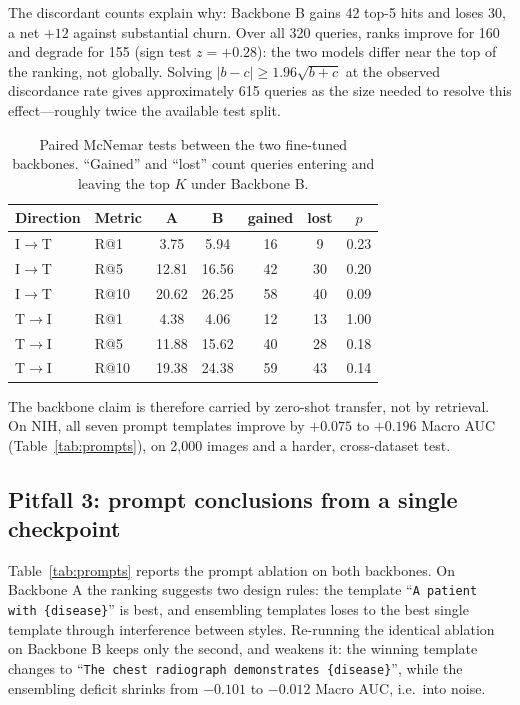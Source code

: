 \documentclass[runningheads]{llncs}
\begin{document}
The discordant counts explain why: Backbone B gains 42 top-5 hits and loses 30,
a net $+12$ against substantial churn. Over all 320 queries, ranks improve for
160 and degrade for 155 (sign test $z=+0.28$): the two models differ near the top
of the ranking, not globally. Solving
$|b-c| \geq 1.96\sqrt{b+c}$ at the observed discordance rate gives approximately
615 queries as the size needed to resolve this effect---roughly twice the
available test split.

\begin{table}[t]
\centering
\caption{Paired McNemar tests between the two fine-tuned backbones. ``Gained''
and ``lost'' count queries entering and leaving the top $K$ under Backbone B.}
\label{tab:mcnemar}
\begin{tabular}{llccccc}
\toprule
Direction & Metric & A & B & gained & lost & $p$ \\
\midrule
I$\rightarrow$T & R@1  & 3.75  & 5.94  & 16 & 9  & 0.23 \\
I$\rightarrow$T & R@5  & 12.81 & 16.56 & 42 & 30 & 0.20 \\
I$\rightarrow$T & R@10 & 20.62 & 26.25 & 58 & 40 & 0.09 \\
T$\rightarrow$I & R@1  & 4.38  & 4.06  & 12 & 13 & 1.00 \\
T$\rightarrow$I & R@5  & 11.88 & 15.62 & 40 & 28 & 0.18 \\
T$\rightarrow$I & R@10 & 19.38 & 24.38 & 59 & 43 & 0.14 \\
\bottomrule
\end{tabular}
\end{table}

The backbone claim is therefore carried by zero-shot transfer, not by retrieval.
On NIH, all seven prompt templates improve by $+0.075$ to $+0.196$ Macro AUC
(Table~\ref{tab:prompts}), on 2{,}000 images and a harder, cross-dataset test.

\subsection{Pitfall 3: prompt conclusions from a single checkpoint}

Table~\ref{tab:prompts} reports the prompt ablation on both backbones. On
Backbone A the ranking suggests two design rules: the template
``\texttt{A patient with \{disease\}}'' is best, and ensembling templates loses to
the best single template through interference between styles. Re-running the
identical ablation on Backbone B keeps only the second, and weakens it: the
winning template changes to ``\texttt{The chest radiograph demonstrates
\{disease\}}'', while the ensembling deficit shrinks from $-0.101$ to $-0.012$
Macro AUC, i.e.\ into noise.
\end{document}
